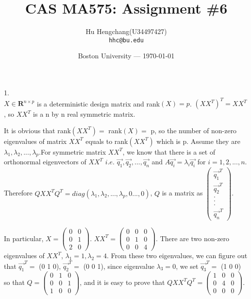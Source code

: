 \documentclass[fleqn]{article}
\title{CAS MA575: Assignment \#6} %
\author{Hu Hengchang(U34497427)\\ \texttt{hhc@bu.edu}} %
\date{Boston University --- \today} %
\begin{document}
\maketitle %




1.\\

$X \in \mathbf{R}^{n \times p}$ is a deterministic design matrix and rank$(X) = p$. $(XX^T)^T = XX^T$, so $XX^T$ is a n by n real symmetric matrix. 

It is obvious that rank$(XX^T) = $ rank$(X) = $ p, so the number of non-zero eigenvalues of matrix $XX^T$ equals to rank$(XX^T)$ which is p. Assume they are $\lambda_1, \lambda_2,...,\lambda_p$.For symmetric matrix $XX^T$, we know that there is a set of orthonormal eigenvectors of $XX^T$ $i.e.$ $\vec{q_1}, \vec{q_2},...,\vec{q_n}$ and $A\vec{q_i} = \lambda_i \vec{q_i}$ for $i = 1,2,...,n$. Therefore $QXX^TQ^T = diag(\lambda_1,\lambda_2,...,\lambda_p,0...,0)$, $Q$ is a matrix as $\left(\begin{matrix}
\vec{q_1}^T \\ 
\vec{q_2}^T \\ 
.\\
.\\
.\\
\vec{q_n}^T
\end{matrix}\right)$.

In particular, $X = \left(\begin{matrix}
	0 & 0 \\ 
	0 & 1 \\ 
	2 & 0
\end{matrix}\right) $. $XX^T = \left(\begin{matrix}
0 & 0 & 0\\ 
0 & 1 & 0\\ 
0 & 0 & 4
\end{matrix}\right) $. There are two non-zero eigenvalues of $XX^T$, $\lambda_1 = 1, \lambda_2 = 4$. From these two eigenvalues, we can figure out that $\vec{q_1}^T =$ (0 1 0), $\vec{q_2}^T =$ (0 0 1), since eigenvalue $\lambda_3 = 0$, we set $\vec{q_3}^T =$ (1 0 0) so that $Q = \left(\begin{matrix}
0 & 1 & 0\\ 
0 & 0 & 1\\ 
1 & 0 & 0
\end{matrix}\right)$, and it is easy to prove that $QXX^TQ^T = \left(\begin{matrix}
1 & 0 & 0\\ 
0 & 4 & 0\\ 
0 & 0 & 0
\end{matrix}\right)$.\\
\end{document}

